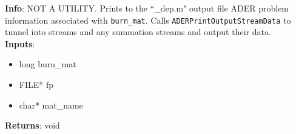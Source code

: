 \textbf{Info}: NOT A UTILITY. Prints to the ``\_dep.m" output file ADER
problem information associated with \texttt{burn\_mat}. Calls
\texttt{ADERPrintOutputStreamData} to tunnel into streams and any summation
streams and output their data.\\

\noindent \textbf{Inputs}:
\begin{itemize}
\item{long burn\_mat}
\item{FILE* fp}
\item{char* mat\_name}
\end{itemize}

\noindent \textbf{Returns}: void
